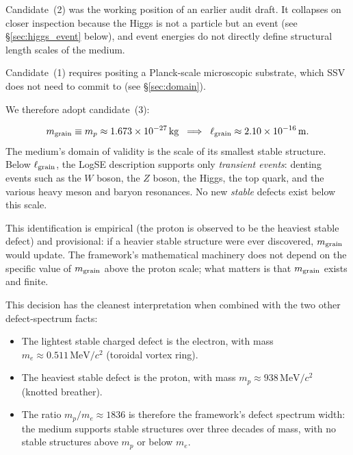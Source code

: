 \documentclass[11pt,a4paper]{article}
\begin{document}
Candidate~(2) was the working position of an earlier audit draft.
It collapses on closer inspection because the Higgs is not a particle
but an event (see \S\ref{sec:higgs_event} below), and event energies
do not directly define structural length scales of the medium.

Candidate~(1) requires positing a Planck-scale microscopic
substrate, which SSV does not need to commit to (see
\S\ref{sec:domain}).

We therefore adopt candidate~(3):

\begin{decisionbox}
\begin{equation*}
    m_{\rm grain} \equiv m_p \approx 1.673\times 10^{-27}\,\mathrm{kg}
    \;\;\Longrightarrow\;\;
    \ell_{\rm grain} \approx 2.10\times 10^{-16}\,\mathrm{m}.
\end{equation*}
The medium's domain of validity is the scale of its smallest stable
structure.  Below $\ell_{\rm grain}$, the LogSE description supports only
\emph{transient events}: denting events such as the $W$ boson, the $Z$
boson, the Higgs, the top quark, and the various heavy meson and baryon
resonances.  No new \emph{stable} defects exist below this scale.

This identification is empirical (the proton is observed to be the
heaviest stable defect) and provisional: if a heavier stable structure
were ever discovered, $m_{\rm grain}$ would update.  The framework's
mathematical machinery does not depend on the specific value of
$m_{\rm grain}$ above the proton scale; what matters is that
$m_{\rm grain}$ exists and finite.
\end{decisionbox}

This decision has the cleanest interpretation when combined with the
two other defect-spectrum facts:
\begin{itemize}
\item The lightest stable charged defect is the electron, with mass
      $m_e \approx 0.511\,\mathrm{MeV}/c^2$ (toroidal vortex ring).
\item The heaviest stable defect is the proton, with mass
      $m_p \approx 938\,\mathrm{MeV}/c^2$ (knotted breather).
\item The ratio $m_p/m_e \approx 1836$ is therefore the framework's
      defect spectrum width: the medium supports stable structures over
      three decades of mass, with no stable structures above
      $m_p$ or below $m_e$.
\end{itemize}
\end{document}
